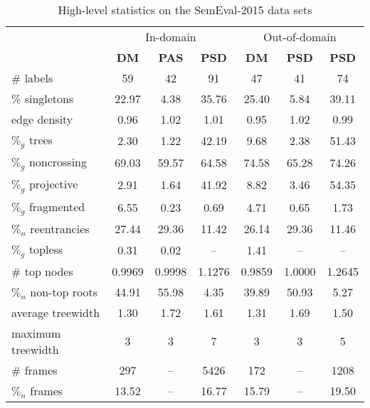 \begin{table}
    \centering
    \smaller[0.5]
    \begin{tabular}{@{}lcccccc@{}}
        \toprule
        & \multicolumn{3}{c}{In-domain}
        & \multicolumn{3}{c}{Out-of-domain} \\
        \cmidrule(lr){2-4}
        \cmidrule(lr){5-7}
        \textbf{} & \textbf{DM} & \textbf{PAS} & \textbf{PSD} &
        \textbf{DM} & \textbf{PSD} & \textbf{PSD} \\
        \midrule
        \# labels & 59 & 42 & 91 & 47 & 41 & 74 \\
        \% singletons & 22.97 & 4.38 & 35.76 & 25.40 & 5.84 & 39.11 \\
        edge density & 0.96 & 1.02 & 1.01 &  0.95 & 1.02 & 0.99 \\
        $\%_g$ trees & 2.30 & 1.22 & 42.19 & 9.68 & 2.38 & 51.43 \\
        $\%_g$ noncrossing & 69.03 & 59.57 & 64.58 & 74.58 & 65.28 & 74.26 \\
        $\%_g$ projective & 2.91 & 1.64 & 41.92 & 8.82 & 3.46 & 54.35 \\
        $\%_g$ fragmented & 6.55 & 0.23 & 0.69 & 4.71 & 0.65 & 1.73 \\
        $\%_n$ reentrancies & 27.44 & 29.36 & 11.42 & 26.14 & 29.36 & 11.46 \\
        $\%_g$ topless & 0.31 & 0.02 & – & 1.41 & – & – \\
        \# top nodes & 0.9969 & 0.9998 & 1.1276 & 0.9859 & 1.0000 & 1.2645 \\
        $\%_n$ non-top roots & 44.91 & 55.98 & 4.35 & 39.89 & 50.93 & 5.27 \\
        average treewidth & 1.30 & 1.72 & 1.61 & 1.31 & 1.69 & 1.50  \\
        maximum treewidth & 3 & 3 & 7  & 3 & 3 & 5 \\
        \midrule
        \# frames & 297 & – & 5426  & 172 & – & 1208 \\
        $\%_n$ frames & 13.52 & – & 16.77 & 15.79 & – & 19.50 \\
        \bottomrule
    \end{tabular}
    \caption{High-level statistics on the SemEval-2015 data sets}
    \label{fig:data}
\end{table}


